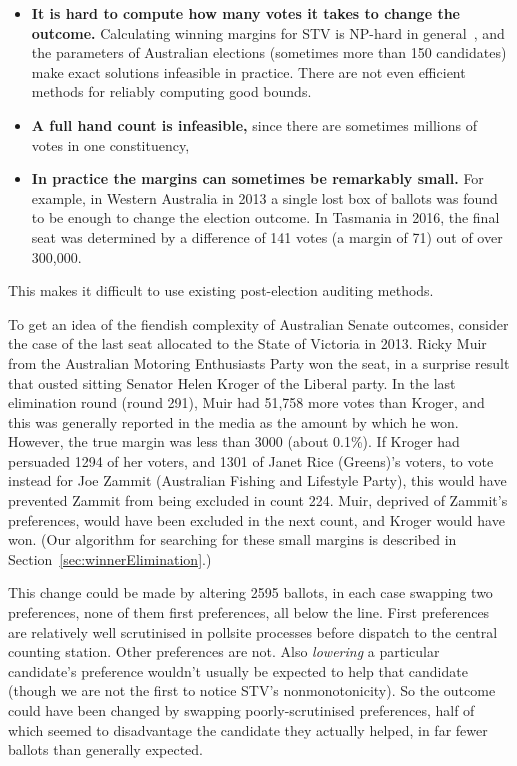 \documentclass[10pt,a4paper]{article}
\newcommand{\shortVersion}[1]{}
\newcommand{\longVersion}[1]{#1}
\newcommand{\shortVersion}[1]{#1}
\newcommand{\longVersion}[1]{}
\begin{document}
\begin{itemize}
	\item {\bf It is hard to compute how many votes it takes to change the outcome.}  Calculating winning margins for STV is NP-hard in general~\cite{Xia2012}, and the parameters of Australian elections (sometimes more than 150 candidates) make exact solutions infeasible in practice.  There are not even efficient methods for reliably computing good bounds. 	
	\item {\bf A full hand count is infeasible,} since there are sometimes millions of votes in one constituency, 
	\item {\bf In practice the margins can sometimes be remarkably small.}  For example, in Western Australia in 2013 a single lost box of ballots was found to be enough to change the election outcome.  In Tasmania in 2016, the final seat was determined by a difference of 141 votes 
	(a margin of 71) out of over 300,000.	
\end{itemize}

This makes it difficult to use existing post-election auditing methods.   


To get an idea of the fiendish complexity of Australian Senate outcomes, consider the case of the last seat allocated to the State of Victoria in 2013.  Ricky Muir from the Australian Motoring Enthusiasts Party won the seat, in a surprise result that ousted sitting Senator 
Helen Kroger of the Liberal party.  In the last elimination round (round 291), Muir had 51,758 more votes than Kroger, and this was generally reported in the media as the amount by which he won.  However, the true margin was less than 3000 (about 0.1\%).  
If Kroger had persuaded 1294 of her voters, and 1301 of Janet Rice (Greens)’s voters, to  vote instead for Joe Zammit (Australian Fishing and Lifestyle Party), this would have prevented Zammit from being excluded in count 224. Muir, deprived of Zammit's preferences, would have been excluded in the next count, and Kroger would have won.   (Our algorithm for searching for these small margins is described in \longVersion{Section~\ref{sec:winnerElimination}.)}
\shortVersion{the full version of this paper.)}


This change could be made by altering 2595 ballots, in each case swapping two preferences, none of them first preferences, all below the line.  First preferences are relatively well scrutinised in pollsite processes before dispatch to the central counting station.  Other preferences are not.   Also \emph{lowering} a particular candidate's preference wouldn't usually be expected to help that candidate (though we are not the first to notice STV's nonmonotonicity).  So the outcome could have been changed by swapping poorly-scrutinised preferences, half of which seemed to disadvantage the candidate they actually helped, in far fewer ballots than generally expected.  
\end{document}
